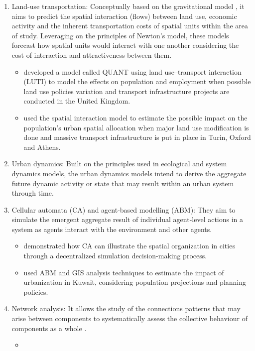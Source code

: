 \documentclass[12pt, a4paper]{report}
\begin{document}
\begin{enumerate}
  \item Land-use transportation: Conceptually based on the gravitational model \citep{wilsonFamilySpatialInteraction1971a}, it aims to predict the spatial interaction (flows) between land use, economic activity and the inherent transportation costs of spatial units within the area of study. Leveraging on the principles of Newton's model, these models forecast how spatial units would interact with one another considering the cost of interaction and attractiveness between them. 
  \begin{itemize}
        
      \item \cite{battyNewFrameworkVery2021} developed a model called QUANT using land use–transport interaction (LUTI) to model the effects on population and employment when possible land use policies variation and transport infrastructure projects are conducted in the United Kingdom.
      \item \cite{lopaneLanduseTransportinteractionFramework2023} used the spatial interaction model to estimate the possible impact on the population's urban spatial allocation when major land use modification is done and massive transport infrastructure is put in place in Turin, Oxford and Athens.

      
  \end{itemize}
  \item Urban dynamics: Built on the principles used in ecological and system dynamics models, the urban dynamics models intend to derive the aggregate future dynamic activity or state that may result within an urban system through time.
  \item Cellular automata (CA) and agent-based modelling (ABM): They aim to simulate the emergent aggregate result of individual agent-level actions in a system as agents interact with the environment and other agents.
  \begin{itemize}
      \item   \cite{battyCellularAutomataUrban1997} demonstrated how CA can illustrate the spatial organization in cities through a decentralized simulation decision-making process.
      \item \cite{alghaisModellingFutureImpacts2018} used ABM and GIS analysis techniques to estimate the impact of urbanization in Kuwait, considering population projections and planning policies.
  \end{itemize}
  \item Network analysis: It allows the study of the connections patterns that may arise between components to systematically assess the collective behaviour of components as a whole \citep{newmanNetworksIntroduction2010}.
  \begin{itemize}
      \item \cite{arcauteCitiesRegionsBritain2016}
  \end{itemize}
\end{enumerate}
\end{document}
